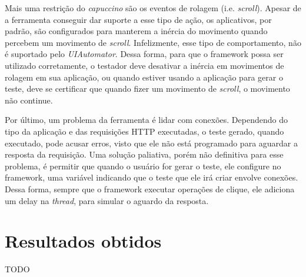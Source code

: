 \documentclass[
    12pt,       %
    openright,      %
    twoside,      %
    a4paper,      %
    english,      %
    french,       %
    spanish,      %
    brazil,       %
    ]{abntex2}
\begin{document}
        Mais uma restrição do \textit{capuccino} são os eventos de rolagem (i.e. \textit{scroll}). Apesar de
        a ferramenta conseguir dar suporte a esse tipo de ação, os aplicativos, por padrão, são configurados
        para manterem a inércia do movimento quando percebem um movimento de \textit{scroll}. Infelizmente,
        esse tipo de comportamento, não é suportado pelo \textit{UIAutomator}. Dessa forma, para que o framework
        possa ser utilizado corretamente, o testador deve desativar a inércia em movimentos de rolagem em
        sua aplicação, ou quando estiver usando a aplicação para gerar o teste, deve se certificar que quando
        fizer um movimento de \textit{scroll}, o movimento não continue.

        Por último, um problema da ferramenta é lidar com conexões. Dependendo do tipo da aplicação
        e das requisições HTTP executadas, o teste gerado, quando executado, pode acusar erros, visto que ele
        não está programado para aguardar a resposta da requisição. Uma solução paliativa, porém não definitiva
        para esse problema, é permitir que quando o usuário for gerar o teste, ele configure no framework, uma
        variável indicando que o teste que ele irá criar envolve conexões. Dessa forma, sempre que o framework
        executar operações de clique, ele adiciona um delay na \textit{thread}, para simular o aguardo da
        resposta.


  \part{Resultados obtidos}
    TODO




\end{document}

